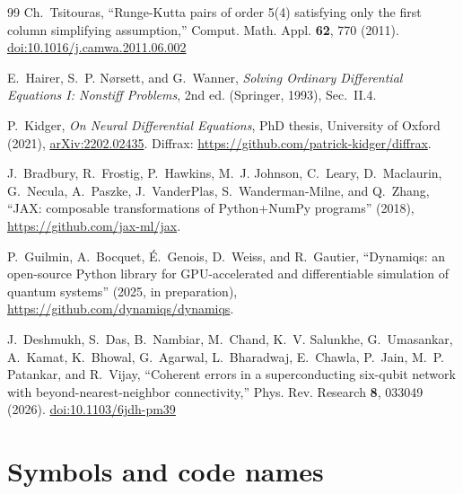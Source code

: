 \documentclass[11pt,a4paper]{article}
\begin{document}
\begin{thebibliography}{99}
Ch.~Tsitouras, ``Runge-Kutta pairs of order 5(4) satisfying only the first column simplifying assumption,'' Comput.
Math. Appl. \textbf{62}, 770 (2011). \href{https://doi.org/10.1016/j.camwa.2011.06.002}{doi:10.1016/j.camwa.2011.06.002}

E.~Hairer, S.~P. N\o rsett, and G.~Wanner, \emph{Solving Ordinary Differential Equations I: Nonstiff Problems}, 2nd
ed. (Springer, 1993), Sec.~II.4.

P.~Kidger, \emph{On Neural Differential Equations}, PhD thesis, University of Oxford (2021),
\href{https://arxiv.org/abs/2202.02435}{arXiv:2202.02435}. Diffrax: \url{https://github.com/patrick-kidger/diffrax}.

J.~Bradbury, R.~Frostig, P.~Hawkins, M.~J. Johnson, C.~Leary, D.~Maclaurin, G.~Necula, A.~Paszke, J.~VanderPlas,
S.~Wanderman-Milne, and Q.~Zhang, ``JAX: composable transformations of Python+NumPy programs'' (2018),
\url{https://github.com/jax-ml/jax}.

P.~Guilmin, A.~Bocquet, \'E.~Genois, D.~Weiss, and R.~Gautier, ``Dynamiqs: an open-source Python library for
GPU-accelerated and differentiable simulation of quantum systems'' (2025, in preparation),
\url{https://github.com/dynamiqs/dynamiqs}.

J.~Deshmukh, S.~Das, B.~Nambiar, M.~Chand, K.~V. Salunkhe, G.~Umasankar, A.~Kamat, K.~Bhowal, G.~Agarwal,
L.~Bharadwaj, E.~Chawla, P.~Jain, M.~P. Patankar, and R.~Vijay, ``Coherent errors in a superconducting six-qubit
network with beyond-nearest-neighbor connectivity,'' Phys. Rev. Research \textbf{8}, 033049 (2026).
\href{https://doi.org/10.1103/6jdh-pm39}{doi:10.1103/6jdh-pm39}

\end{thebibliography}

\appendix
\section{Symbols and code names}
\end{document}
